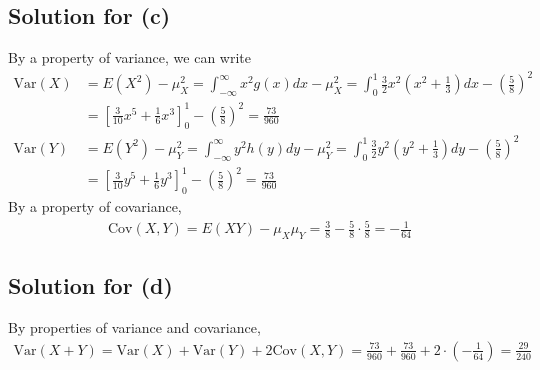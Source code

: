 \documentclass{scrartcl}
\begin{document}
\subsection{Solution for (c)}
By a property of variance, we can write
\begin{align*}
  \mathrm{Var}(X)
  &= E(X^2) - \mu^2_X
  = \int^\infty_{-\infty} x^2 g(x) dx - \mu^2_X
  = \int^1_0 \frac{3}{2} x^2 \left( x^2 + \frac{1}{3} \right) dx
    - \left( \frac{5}{8} \right)^2 \\
  &= \left[ \frac{3}{10} x^5 + \frac{1}{6} x^3 \right]^1_0
    - \left( \frac{5}{8} \right)^2
  = \frac{73}{960} \\
  \mathrm{Var}(Y)
  &= E(Y^2) - \mu^2_Y
  = \int^\infty_{-\infty} y^2 h(y) dy - \mu^2_Y
  = \int^1_0 \frac{3}{2} y^2 \left( y^2 + \frac{1}{3} \right) dy
    - \left( \frac{5}{8} \right)^2 \\
  &= \left[ \frac{3}{10} y^5 + \frac{1}{6} y^3 \right]^1_0
    - \left( \frac{5}{8} \right)^2
  = \frac{73}{960}
\end{align*}
By a property of covariance,
\begin{align*}
  \mathrm{Cov}(X, Y)
  = E(XY) - \mu_X \mu_Y
  = \frac{3}{8} - \frac{5}{8} \cdot \frac{5}{8} = -\frac{1}{64}
\end{align*}

\subsection{Solution for (d)}
By properties of variance and covariance,
\begin{align*}
  \mathrm{Var}(X + Y)
  = \mathrm{Var}(X) + \mathrm{Var}(Y) + 2\mathrm{Cov}(X, Y)
  = \frac{73}{960} + \frac{73}{960} + 2 \cdot \left( -\frac{1}{64} \right)
  = \frac{29}{240}
\end{align*}
\end{document}
